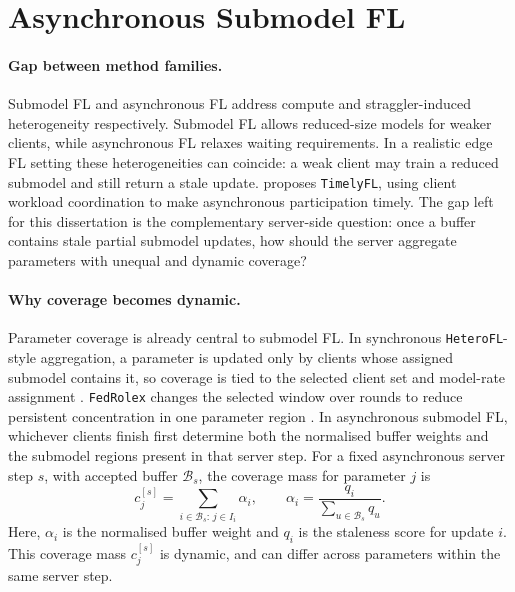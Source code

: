 


\section{Asynchronous Submodel FL}
\label{sec:async_submodel_related}


\paragraph{Gap between method families.}
Submodel FL and asynchronous FL address compute and straggler-induced heterogeneity respectively. Submodel FL allows reduced-size models for weaker clients, while asynchronous FL relaxes waiting requirements. In a realistic edge FL setting these heterogeneities can coincide: a weak client may train a reduced submodel and still return a stale update. \cite{zhang2023timelyfl} proposes \texttt{TimelyFL}, using client workload coordination to make asynchronous participation timely. The gap left for this dissertation is the complementary server-side question: once a buffer contains stale partial submodel updates, how should the server aggregate parameters with unequal and dynamic coverage?

\paragraph{Why coverage becomes dynamic.}
Parameter coverage is already central to submodel FL. In synchronous \texttt{HeteroFL}-style aggregation, a parameter is updated only by clients whose assigned submodel contains it, so coverage is tied to the selected client set and model-rate assignment \parencite{diao2021heterofl}. \texttt{FedRolex} changes the selected window over rounds to reduce persistent concentration in one parameter region \parencite{alam2022fedrolex}. In asynchronous submodel FL, whichever clients finish first determine both the normalised buffer weights and the submodel regions present in that server step. For a fixed asynchronous server step \(s\), with accepted buffer \(\mathcal{B}_s\), the coverage mass for parameter \(j\) is
\[
    c_j^{[s]}
    =
    \sum_{i\in\mathcal{B}_s:\, j\in I_i}\alpha_i,
    \qquad
    \alpha_i
    =
    \frac{q_i}{\sum_{u\in\mathcal{B}_s}q_u}.
\]
Here, \(\alpha_i\) is the normalised buffer weight and \(q_i\) is the staleness score for update \(i\). This coverage mass \(c_j^{[s]}\) is dynamic, and can differ across parameters within the same server step.

